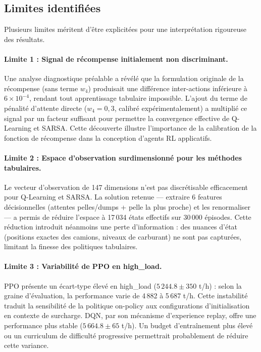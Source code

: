 \documentclass[11pt,a4paper]{report}
\begin{document}
\subsection{Limites identifiées}

Plusieurs limites méritent d'être explicitées pour une interprétation rigoureuse des résultats.

\paragraph{Limite 1 : Signal de récompense initialement non discriminant.}
Une analyse diagnostique préalable a révélé que la formulation originale de la récompense (sans terme $w_4$) produisait une différence inter-actions inférieure à $6 \times 10^{-4}$, rendant tout apprentissage tabulaire impossible. L'ajout du terme de pénalité d'attente directe ($w_4 = 0{,}3$, calibré expérimentalement) a multiplié ce signal par un facteur suffisant pour permettre la convergence effective de Q-Learning et SARSA.  Cette découverte illustre l'importance de la calibration de la fonction de récompense dans la conception d'agents RL applicatifs.

\paragraph{Limite 2 : Espace d'observation surdimensionné pour les méthodes tabulaires.}
Le vecteur d'observation de 147 dimensions n'est pas discrétisable efficacement pour Q-Learning et SARSA. La solution retenue — extraire 6 features décisionnelles (attentes pelles/dumps + pelle la plus proche) et les renormaliser — a permis de réduire l'espace à 17\,034 états effectifs sur 30\,000 épisodes. Cette réduction introduit néanmoins une perte d'information : des nuances d'état (positions exactes des camions, niveaux de carburant) ne sont pas capturées, limitant la finesse des politiques tabulaires.

\paragraph{Limite 3 : Variabilité de PPO en high\_load.}
PPO présente un écart-type élevé en high\_load ($5\,244.8 \pm 350$ t/h) : selon la graine d'évaluation, la performance varie de 4\,882 à 5\,687 t/h. Cette instabilité traduit la sensibilité de la politique on-policy aux configurations d'initialisation en contexte de surcharge. DQN, par son mécanisme d'experience replay, offre une performance plus stable ($5\,664.8 \pm 65$ t/h). Un budget d'entraînement plus élevé ou un curriculum de difficulté progressive permettrait probablement de réduire cette variance.
\end{document}
